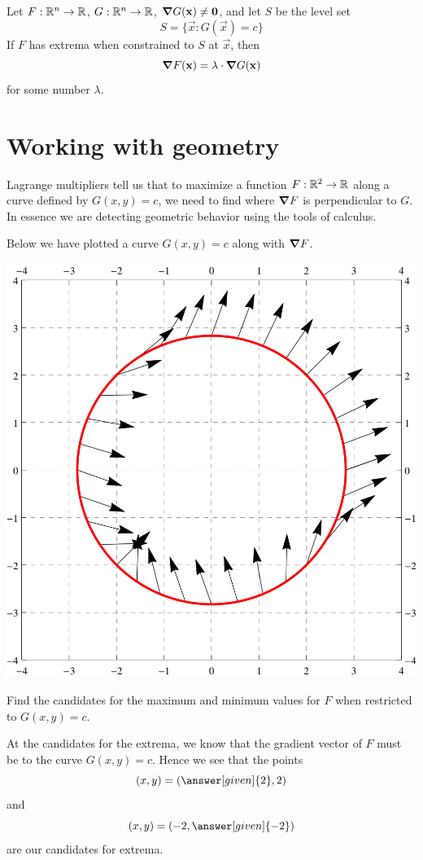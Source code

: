 \documentclass{ximera}
\begin{document}
\begin{theorem}
  Let $F:\mathbb R^n\to\mathbb R$, $G:\mathbb R^n\to\mathbb R$, $\boldsymbol\nabla G(\mathbf{x}) \ne \mathbf{0}$,
  and let $S$ be the level set
  \[
  S = \{\vec{x}: G(\vec{x}) = c\}
  \]
  If $F$ has extrema when constrained to $S$ at $\vec{x}$, then
  \[
  \boldsymbol\nabla F(\mathbf{x}) = \lambda \cdot \boldsymbol\nabla G(\mathbf{x})
  \]
  for some number $\lambda$.
\end{theorem}


  


\section{Working with geometry}

Lagrange multipliers tell us that to maximize a function $F:\mathbb R^2\to\mathbb R$
along a curve defined by $G(x,y) = c$, we need to find where $\boldsymbol\nabla F$
is perpendicular to $G$. In essence we are detecting geometric
behavior using the tools of calculus.

\begin{example}
  Below we have plotted a curve $G(x,y) = c$ along with $\boldsymbol\nabla F$.
  \begin{image}
    \includegraphics{curveVectors1.jpg}
  \end{image}
  Find the candidates for the maximum and minimum values for $F$ when
  restricted to $G(x,y) = c$.
  \begin{explanation}
    At the candidates for the extrema, we know that the gradient
    vector of $F$ must be
     to
    the curve $G(x,y) = c$. Hence we
    see that the points
    \[
    (x,y) = (\answer[given]{2},2)
    \]
    and
    \[
    (x,y) = (-2,\answer[given]{-2})
    \]
    are our candidates for extrema.
  \end{explanation}
\end{example}
\end{document}
